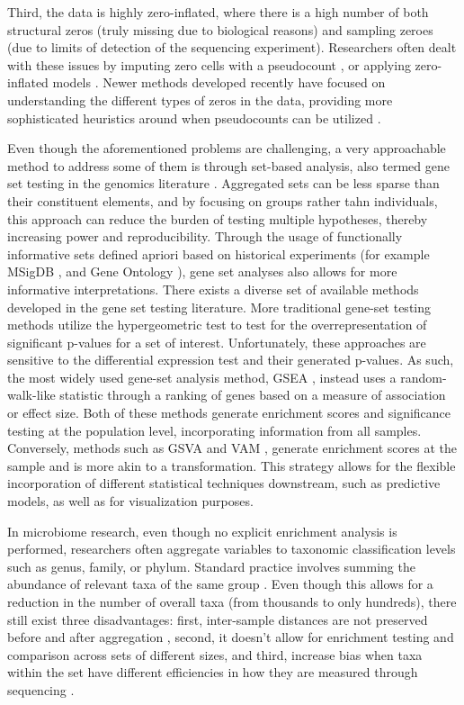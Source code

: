 \documentclass{article}
\begin{document}
Third, the data is highly zero-inflated, where there is a high number of both structural zeros (truly missing due to biological reasons) and sampling zeroes (due to limits of detection of the sequencing experiment). Researchers often dealt with these issues by imputing zero cells with a pseudocount \cite{kurtz2015}, or applying zero-inflated models \cite{chen2018, kaul2017}. Newer methods developed recently have focused on understanding the different types of zeros in the data, providing more sophisticated heuristics around when pseudocounts can be utilized \cite{kaul2017a}.   

Even though the aforementioned problems are challenging, a very approachable method to address some of them is through set-based analysis, also termed gene set testing in the genomics literature \cite{khatri2012, goeman2007}. Aggregated sets can be less sparse than their constituent elements, and by focusing on groups rather tahn individuals, this approach can reduce the burden of testing multiple hypotheses, thereby increasing power and reproducibility. Through the usage of functionally informative sets defined apriori based on historical experiments (for example MSigDB \cite{subramanian2005}, and Gene Ontology \cite{ashburner2000}), gene set analyses also allows for more informative interpretations. There exists a diverse set of available methods developed in the gene set testing literature. More traditional gene-set testing methods utilize the hypergeometric test to test for the overrepresentation of significant p-values for a set of interest. Unfortunately, these approaches are sensitive to the differential expression test and their generated p-values. As such, the most widely used gene-set analysis method, GSEA \cite{subramanian2005}, instead uses a random-walk-like statistic through a ranking of genes based on a measure of association or effect size. Both of these methods generate enrichment scores and significance testing at the population level, incorporating information from all samples. Conversely, methods such as GSVA \cite{hanzelmann2013} and VAM \cite{frost2020a}, generate enrichment scores at the sample and is more akin to a transformation. This strategy allows for the flexible incorporation of different statistical techniques downstream, such as predictive models, as well as for visualization purposes.  

In microbiome research, even though no explicit enrichment analysis is performed, researchers often aggregate variables to taxonomic classification levels such as genus, family, or phylum. Standard practice involves summing the abundance of relevant taxa of the same group \cite{mclaren2019}. Even though this allows for a reduction in the number of overall taxa (from thousands to only hundreds), there still exist three disadvantages: first, inter-sample distances are not preserved before and after aggregation \cite{egozcue2005}, second, it doesn't allow for enrichment testing and comparison across sets of different sizes, and third, increase bias when taxa within the set have different efficiencies in how they are measured through sequencing \cite{mclaren2019}.    
\end{document}
